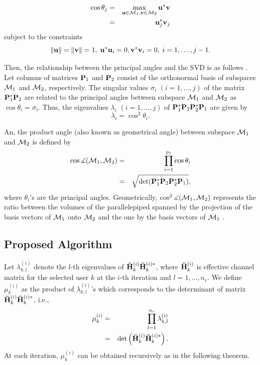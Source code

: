 \documentclass[journal,twoside]{IEEEtranTCOM}
\begin{document}
\begin{eqnarray}
\cos {\theta _j} & = &\mathop {\max }\limits_{{\bf{u}} \in {{\cal{M}}_1},{\bf{v}} \in {{\cal{M}}_2}} {{\bf{u}}^*}{\bf{v}} \nonumber \\
& = & {\bf{u}}_j^*{{\bf{v}}_j}
\end{eqnarray}
subject to the constraints
\begin{equation}
\left\| {\bf{u}} \right\| = \left\| {\bf{v}} \right\| = 1, \; {\bf{u}}^*{{\bf{u}}_i} = 0,{\bf{v}}^*{{\bf{v}}_i} = 0, \; i = 1,  \ldots ,j - 1.
\end{equation}

Then, the relationship between the principal angles and the SVD is as follows \cite{Angle-SVD}.
Let columns of matrices ${\bf{P}}_1$ and ${\bf{P}}_2$ consist of the orthonormal basis of subspaces ${\cal{M}}_1$ and ${\cal{M}}_2$, respectively. The singular values $\sigma_i$ $(i=1,\ldots,j)$ of the matrix ${\bf{P}}_1^*{\bf{P}}_2$ are related to the principal angles between subspace ${\cal{M}}_1$ and ${\cal{M}}_2$ as $\cos\theta_i=\sigma_i$. Thus, the eigenvalues $\lambda_i$ $(i=1,\ldots,j)$ of ${\bf{P}}_1^* {\bf{P}}_2 {\bf{P}}_2^* {\bf{P}}_1$ are given by
\begin{equation}
\lambda_i=\cos^2\theta_i.
\end{equation}

An, the product angle (also known as geometrical angle) between subspace ${\cal{M}}_1$ and ${\cal{M}}_2$ is defined by \cite{ProductAngle,ProductAngle2}
\begin{eqnarray}
\cos \measuredangle ({\cal{M}}_1,{\cal{M}}_2) & = & \prod\limits_{i=1}^{{p_1}} {\cos {\theta_{i}}} \nonumber \\
& = & \sqrt{\det({\bf{P}}_1^* {\bf{P}}_2 {\bf{P}}_2^* {\bf{P}}_1)},
\end{eqnarray}
where $\theta_i$'s are the principal angles. Geometrically, $\cos ^2 \measuredangle ({\cal{M}}_1,{\cal{M}}_2)$ represents the ratio between the volumes of the parallelepiped spanned by the projection of the basis vectors of ${\cal{M}}_1$ onto ${\cal{M}}_2$ and the one  by the basis vectors of ${\cal{M}}_1$ \cite{ProductAngle2}.

\subsection{Proposed Algorithm}

Let $\lambda^{(i)}_{k,l}$ denote the $l$-th eigenvalues of ${\bf{\bar H}}_k^{(i)}{\bf{\bar H}}_k^{(i)*}$, where ${\bf{\bar H}}_k^{(i)}$ is effective channel matrix for the selected user $k$ at the $i$-th iteration and $l=1,\ldots,n_r$. We define $\mu _k^{(i)}$ as the product of $\lambda^{(i)}_{k,l}$'s which corresponds to the determinant of matrix ${\bf{\bar H}}_k^{(i)}{\bf{\bar H}}_k^{(i)*}$, i.e.,
\begin{eqnarray}
\mu _k^{(i)} & = & \prod\limits_{l = 1}^{{n_r}} {\lambda _{k,l}^{(i)}} \nonumber \\
 & = & \det \left({\bf{\bar H}}_k^{(i)}{\bf{\bar H}}_k^{(i)*}\right).
\end{eqnarray}
At each iteration, $\mu _k^{(i)}$ can be obtained recursively as in the following theorem.
\end{document}
